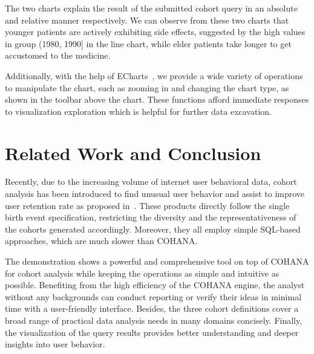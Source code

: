 The two charts explain the result of the submitted cohort query in an absolute and relative manner respectively. We can observe from these two charts that younger patients are actively exhibiting side effects, suggested by the high values in group (1980, 1990] in the line chart, while elder patients take longer to get accustomed to the medicine.%

Additionally, with the help of ECharts~\cite{echarts}, we provide a wide variety of operations to manipulate the chart, such as zooming in and changing the chart type, as shown in the toolbar above the chart. These functions afford immediate responses to visualization exploration which is helpful for further data excavation.

\section{Related Work and Conclusion}

Recently, due to the increasing volume of internet user behavioral data, cohort
analysis has been introduced to find unusual user behavior and assist to
improve user retention rate as proposed in~\cite{amplitude, mixpanel, rjmetrics}. These
products directly follow the single birth event specification, restricting the diversity and the representativeness of the cohorts generated accordingly.
Moreover, they all employ simple SQL-based approaches, which are much slower than COHANA.

The demonstration shows a powerful and comprehensive tool on top of COHANA for cohort analysis while keeping the operations as simple and intuitive as possible. Benefiting from the high efficiency of the COHANA engine, the analyst without any backgrounds can conduct reporting or verify their ideas in minimal time with a user-friendly interface. Besides, the three cohort definitions cover a broad range of practical data analysis needs in many domains concisely. Finally, the visualization of the query results provides better understanding and deeper insights into user behavior.